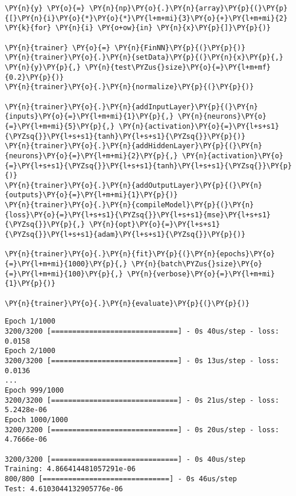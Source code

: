 \begin{Answer}
\begin{tcolorbox}[size=fbox, boxrule=1pt,colback=cellbackground, colframe=cellborder]
\begin{Verbatim}[commandchars=\\\{\}]
\PY{n}{y} \PY{o}{=} \PY{n}{np}\PY{o}{.}\PY{n}{array}\PY{p}{(}\PY{p}{[}\PY{n}{i}\PY{o}{*}\PY{o}{*}\PY{l+m+mi}{3}\PY{o}{+}\PY{l+m+mi}{2} \PY{k}{for} \PY{n}{i} \PY{o+ow}{in} \PY{n}{x}\PY{p}{]}\PY{p}{)}
	
\PY{n}{trainer} \PY{o}{=} \PY{n}{FinNN}\PY{p}{(}\PY{p}{)}
\PY{n}{trainer}\PY{o}{.}\PY{n}{setData}\PY{p}{(}\PY{n}{x}\PY{p}{,} \PY{n}{y}\PY{p}{,} \PY{n}{test\PYZus{}size}\PY{o}{=}\PY{l+m+mf}{0.2}\PY{p}{)}
\PY{n}{trainer}\PY{o}{.}\PY{n}{normalize}\PY{p}{(}\PY{p}{)}
	
\PY{n}{trainer}\PY{o}{.}\PY{n}{addInputLayer}\PY{p}{(}\PY{n}{inputs}\PY{o}{=}\PY{l+m+mi}{1}\PY{p}{,} \PY{n}{neurons}\PY{o}{=}\PY{l+m+mi}{5}\PY{p}{,} \PY{n}{activation}\PY{o}{=}\PY{l+s+s1}{\PYZsq{}}\PY{l+s+s1}{tanh}\PY{l+s+s1}{\PYZsq{}}\PY{p}{)}
\PY{n}{trainer}\PY{o}{.}\PY{n}{addHiddenLayer}\PY{p}{(}\PY{n}{neurons}\PY{o}{=}\PY{l+m+mi}{2}\PY{p}{,} \PY{n}{activation}\PY{o}{=}\PY{l+s+s1}{\PYZsq{}}\PY{l+s+s1}{tanh}\PY{l+s+s1}{\PYZsq{}}\PY{p}{)}
\PY{n}{trainer}\PY{o}{.}\PY{n}{addOutputLayer}\PY{p}{(}\PY{n}{outputs}\PY{o}{=}\PY{l+m+mi}{1}\PY{p}{)}
\PY{n}{trainer}\PY{o}{.}\PY{n}{compileModel}\PY{p}{(}\PY{n}{loss}\PY{o}{=}\PY{l+s+s1}{\PYZsq{}}\PY{l+s+s1}{mse}\PY{l+s+s1}{\PYZsq{}}\PY{p}{,} \PY{n}{opt}\PY{o}{=}\PY{l+s+s1}{\PYZsq{}}\PY{l+s+s1}{adam}\PY{l+s+s1}{\PYZsq{}}\PY{p}{)}
	
\PY{n}{trainer}\PY{o}{.}\PY{n}{fit}\PY{p}{(}\PY{n}{epochs}\PY{o}{=}\PY{l+m+mi}{1000}\PY{p}{,} \PY{n}{batch\PYZus{}size}\PY{o}{=}\PY{l+m+mi}{100}\PY{p}{,} \PY{n}{verbose}\PY{o}{=}\PY{l+m+mi}{1}\PY{p}{)}
	
\PY{n}{trainer}\PY{o}{.}\PY{n}{evaluate}\PY{p}{(}\PY{p}{)}
\end{Verbatim}
\end{tcolorbox}

\begin{tcolorbox}[size=fbox, boxrule=1pt,colback=cellbackground, colframe=cellborder]
\begin{Verbatim}[commandchars=\\\{\}]
Epoch 1/1000
3200/3200 [==============================] - 0s 40us/step - loss: 0.0158
Epoch 2/1000
3200/3200 [==============================] - 0s 13us/step - loss: 0.0136
...
Epoch 999/1000
3200/3200 [==============================] - 0s 21us/step - loss: 5.2428e-06
Epoch 1000/1000
3200/3200 [==============================] - 0s 20us/step - loss: 4.7666e-06

3200/3200 [==============================] - 0s 40us/step
Training: 4.866414481057291e-06
800/800 [==============================] - 0s 46us/step
Test: 4.6103044132905776e-06
\end{Verbatim}
\end{tcolorbox}


\end{Answer}
